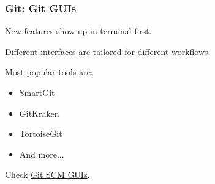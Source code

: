 \begin{frame}

\frametitle{Git: Git GUIs}

New features show up in terminal first. 

Different interfaces are tailored for different workflows. 

Most popular tools are:
\begin{itemize}
\item SmartGit
\item GitKraken
\item TortoiseGit
\item And more...
\end{itemize}

Check \href{https://git-scm.com/downloads/guis}{Git SCM GUIs}.

\end{frame}